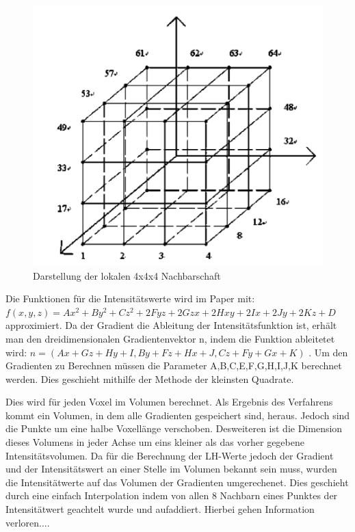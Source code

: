 \begin{figure}[!h] 
\centering 
\includegraphics[width=\textwidth]{Logos/VoxelEdges.PNG}
\caption{Darstellung der lokalen 4x4x4 Nachbarschaft} 
\label{fig:nachbarschaft} 
\end{figure}




Die Funktionen für die Intensitätswerte wird im Paper mit:
\newline
$f(x,y,z) = Ax^{2}+By^{2}+Cz^{2}+2Fyz+2Gzx+2Hxy+2Ix+2Jy+2Kz+D$ 
\newline
approximiert. Da der Gradient die Ableitung der Intensitätsfunktion ist, erhält man den dreidimensionalen Gradientenvektor n, indem die Funktion ableitetet wird:
\newline
$n = (Ax+Gz+Hy+I, By+Fz+Hx+J, Cz + Fy + Gx + K)$ .
\newline
Um den Gradienten zu Berechnen müssen die Parameter A,B,C,E,F,G,H,I,J,K  berechnet werden. Dies geschieht mithilfe der Methode der kleinsten Quadrate.

Dies wird für jeden Voxel im Volumen berechnet. Als Ergebnis des Verfahrens kommt ein Volumen, in dem alle Gradienten gespeichert sind, heraus. Jedoch sind die Punkte um eine halbe Voxellänge verschoben. Desweiteren ist die Dimension dieses Volumens in jeder Achse um eins kleiner als das vorher gegebene Intensitätsvolumen.
Da für die Berechnung der LH-Werte jedoch der Gradient und der Intensitätswert an einer Stelle im Volumen bekannt sein muss, wurden die Intensitätwerte auf das Volumen der Gradienten umgerechenet. Dies geschieht durch eine einfach Interpolation indem von allen 8 Nachbarn eines Punktes der Intensitätwert geachtelt wurde und aufaddiert. Hierbei gehen Information verloren....


